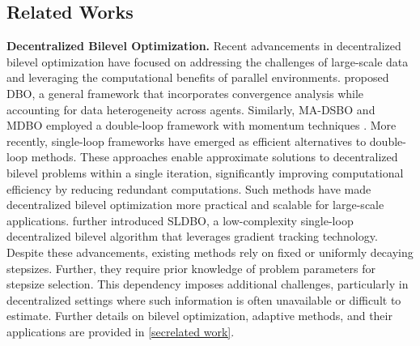 \documentclass{article}
\theoremstyle{plain}
\theoremstyle{definition}
\theoremstyle{remark}
\begin{document}
\vspace{-0.3cm}
\subsection{Related Works}
\vspace{-0.2cm}
\textbf{Decentralized Bilevel Optimization.}
Recent advancements in decentralized bilevel optimization have focused on addressing the challenges of large-scale data and leveraging the computational benefits of parallel environments. 
\citet{chen2024decentralized} proposed DBO, a general framework that incorporates convergence analysis while accounting for data heterogeneity across agents. Similarly, MA-DSBO \citep{chen2023decentralized} and MDBO \citep{gao2023convergence} employed a double-loop framework with momentum techniques \citep{liu2020improved}.  
More recently, single-loop frameworks have emerged as efficient alternatives to double-loop methods. These approaches \citep{chen2024optimal, dagreou2022framework, kong2024decentralized, zhang2023communication} enable approximate solutions to decentralized bilevel problems within a single iteration, significantly improving computational efficiency by reducing redundant computations. Such methods have made decentralized bilevel optimization more practical and scalable for large-scale applications. \citet{dong2023single} further introduced SLDBO, a low-complexity single-loop decentralized bilevel algorithm that leverages gradient tracking technology.  
Despite these advancements, existing methods rely on fixed or uniformly decaying stepsizes. Further, they require prior knowledge of problem parameters for stepsize selection. This dependency imposes additional challenges, particularly in decentralized settings where such information is often unavailable or difficult to estimate. 
Further details on bilevel optimization, adaptive methods, and their applications are provided in \cref{secrelated work}.

\vspace{-0.35cm}
\end{document}
